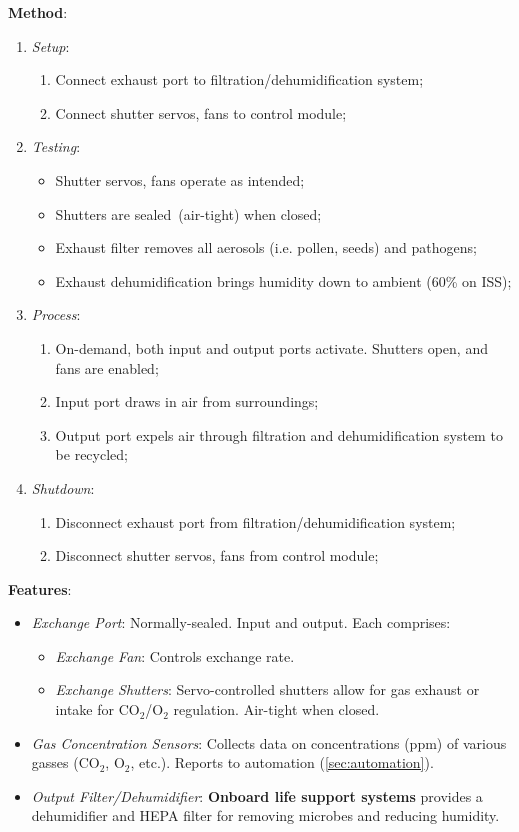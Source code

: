 \documentclass{../tex/report}
\begin{document}
\textbf{Method}:
\begin{enumerate}
    \item \textit{Setup}:
    \begin{enumerate}
        \item Connect exhaust port to filtration/dehumidification system;
        \item Connect shutter servos, fans to control module;
    \end{enumerate}
    \item \textit{Testing}:
    \begin{itemize}
        \item Shutter servos, fans operate as intended;
        \item Shutters are sealed (air-tight) when closed;
        \item Exhaust filter removes all aerosols (i.e. pollen, seeds) and pathogens;
        \item Exhaust dehumidification brings humidity down to ambient (60\% on ISS); %
    \end{itemize}
    \item \textit{Process}:
    \begin{enumerate}
        \item On-demand, both input and output ports activate. Shutters open, and fans are enabled;
        \item Input port draws in air from surroundings;
        \item Output port expels air through filtration and dehumidification system to be recycled;
    \end{enumerate}
    \item \textit{Shutdown}:
    \begin{enumerate}
        \item Disconnect exhaust port from filtration/dehumidification system;
        \item Disconnect shutter servos, fans from control module;
    \end{enumerate}
\end{enumerate}

\textbf{Features}:
\begin{itemize}
    \item \textit{Exchange Port}: Normally-sealed. Input and output. Each comprises:
    \begin{itemize}
        \item \textit{Exchange Fan}: Controls exchange rate. 
        \item \textit{Exchange Shutters}: Servo-controlled shutters allow for gas exhaust or intake for CO${}_2$/O${}_2$ regulation. Air-tight when closed.
    \end{itemize}
    \item \textit{Gas Concentration Sensors}: Collects data on concentrations (ppm) of various gasses (CO${}_2$, O${}_2$, etc.). Reports to automation (\ref{sec:automation}).
    \item \textit{Output Filter/Dehumidifier}: \textbf{Onboard life support systems} provides a dehumidifier and HEPA filter for removing microbes and reducing humidity.
\end{itemize}
\end{document}
